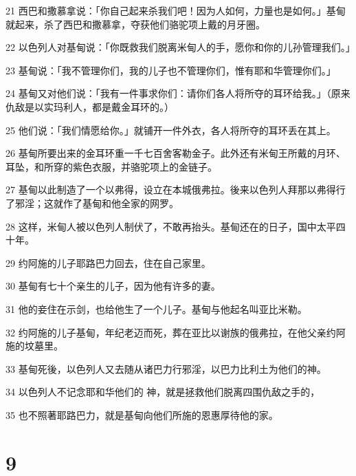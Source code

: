 \par 21 西巴和撒慕拿说：「你自己起来杀我们吧！因为人如何，力量也是如何。」基甸就起来，杀了西巴和撒慕拿，夺获他们骆驼项上戴的月牙圈。
\par 22 以色列人对基甸说：「你既救我们脱离米甸人的手，愿你和你的儿孙管理我们。」
\par 23 基甸说：「我不管理你们，我的儿子也不管理你们，惟有耶和华管理你们。」
\par 24 基甸又对他们说：「我有一件事求你们：请你们各人将所夺的耳环给我。」（原来仇敌是以实玛利人，都是戴金耳环的。）
\par 25 他们说：「我们情愿给你。」就铺开一件外衣，各人将所夺的耳环丢在其上。
\par 26 基甸所要出来的金耳环重一千七百舍客勒金子。此外还有米甸王所戴的月环、耳坠，和所穿的紫色衣服，并骆驼项上的金链子。
\par 27 基甸以此制造了一个以弗得，设立在本城俄弗拉。後来以色列人拜那以弗得行了邪淫；这就作了基甸和他全家的网罗。
\par 28 这样，米甸人被以色列人制伏了，不敢再抬头。基甸还在的日子，国中太平四十年。
\par 29 约阿施的儿子耶路巴力回去，住在自己家里。
\par 30 基甸有七十个亲生的儿子，因为他有许多的妻。
\par 31 他的妾住在示剑，也给他生了一个儿子。基甸与他起名叫亚比米勒。
\par 32 约阿施的儿子基甸，年纪老迈而死，葬在亚比以谢族的俄弗拉，在他父亲约阿施的坟墓里。
\par 33 基甸死後，以色列人又去随从诸巴力行邪淫，以巴力比利土为他们的神。
\par 34 以色列人不记念耶和华他们的 神，就是拯救他们脱离四围仇敌之手的，
\par 35 也不照著耶路巴力，就是基甸向他们所施的恩惠厚待他的家。

\chapter{9}

